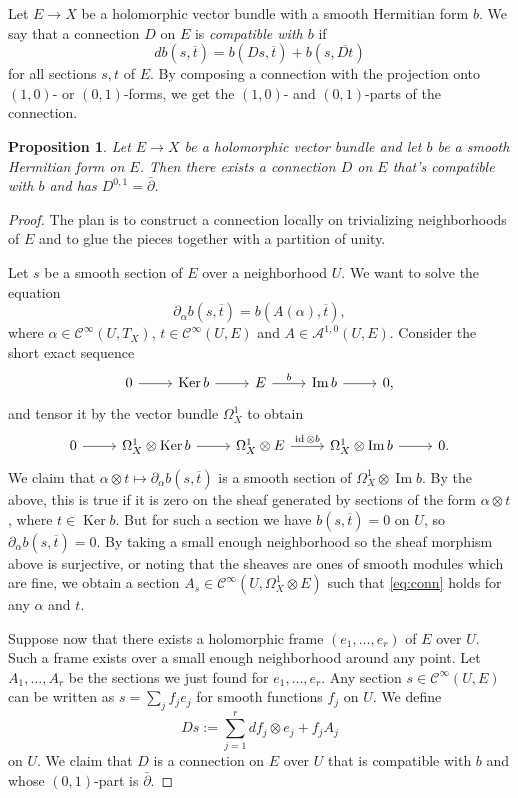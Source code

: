 \documentclass[10pt,a4paper]{amsart}
\newtheorem{prop}[theo]{Proposition}
\theoremstyle{definition}
\newcommand{\cc}[1]{\mathcal{#1}}
\def\ov#1{\overline{#1}}
\DeclareMathOperator{\im}{Im}
\DeclareMathOperator{\Ker}{Ker}
\DeclareMathOperator{\id}{id}
\begin{document}
Let $E \to X$ be a holomorphic vector bundle with a smooth Hermitian form $b$. We say that a connection $D$ on $E$ is \emph{compatible with $b$} if
\[
d b(s, \ov t) = b(Ds, \ov t) + b(s, \ov{Dt})
\]
for all sections $s, t$ of $E$. By composing a connection with the projection onto $(1,0)$- or $(0,1)$-forms, we get the $(1,0)$- and $(0,1)$-parts of the connection.


\begin{prop}
Let $E \to X$ be a holomorphic vector bundle and let $b$ be a smooth Hermitian form on $E$. Then there exists a connection $D$ on $E$ that's compatible with $b$ and has $D^{0,1} = \bar\partial$.
\end{prop}


\begin{proof}
The plan is to construct a connection locally on trivializing neighborhoods of $E$ and to glue the pieces together with a partition of unity.

Let $s$ be a smooth section of $E$ over a neighborhood $U$. We want to solve the equation
\begin{equation}
\label{eq:conn}
\partial_\alpha b(s, \ov t)
= b(A(\alpha), \ov t),
\end{equation}
where $\alpha \in \cc C^\infty(U, T_X)$, $t \in \cc C^\infty(U, E)$ and $A \in \cc A^{1,0}(U, E)$. Consider the short exact sequence
\[
\begin{tikzcd}
0 \ar[r] &
\Ker b \ar[r] &
E \ar[r,"b"] &
\im b \ar[r] &
0,
\end{tikzcd}
\]
and tensor it by the vector bundle $\Omega^1_X$ to obtain
\[
\begin{tikzcd}
0 \ar[r] &
\Omega^1_X \otimes \Ker b \ar[r] &
\Omega^1_X \otimes E \ar[r,"\id \otimes b"] &
\Omega^1_X \otimes \im b \ar[r] &
0.
\end{tikzcd}
\]
We claim that $\alpha \otimes t \mapsto \partial_\alpha b(s, \ov t)$ is a smooth section of $\Omega^1_X \otimes \im b$. By the above, this is true if it is zero on the sheaf generated by sections of the form $\alpha \otimes t$, where $t \in \Ker b$. But for such a section we have $b(s, \ov t) = 0$ on $U$, so $\partial_\alpha b(s, \ov t) = 0$. By taking a small enough neighborhood so the sheaf morphism above is surjective, or noting that the sheaves are ones of smooth modules which are fine, we obtain a section $A_s \in \cc C^\infty(U, \Omega_X^1 \otimes E)$ such that \eqref{eq:conn} holds for any $\alpha$ and $t$.

Suppose now that there exists a holomorphic frame $(e_1, \ldots, e_r)$ of $E$ over $U$. Such a frame exists over a small enough neighborhood around any point. Let $A_1, \ldots, A_r$ be the sections we just found for $e_1, \ldots, e_r$. Any section $s \in \cc C^\infty(U, E)$ can be written as $s = \sum_j f_j e_j$ for smooth functions $f_j$ on $U$. We define
\[
D s := \sum_{j=1}^r df_j \otimes e_j + f_j A_j
\]
on $U$. We claim that $D$ is a connection on $E$ over $U$ that is compatible with $b$ and whose $(0,1)$-part is $\bar\partial$.


\end{proof}
\end{document}
